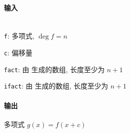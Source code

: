 \paragraph{输入}~\\

\verb|f|: 多项式, \(\deg f=n\)

\verb|c|: 偏移量

\verb|fact|: 由  生成的数组, 长度至少为 \(n+1\)

\verb|ifact|: 由  生成的数组, 长度至少为 \(n+1\)

\paragraph{输出}

多项式 \(g(x)=f(x+c)\)
